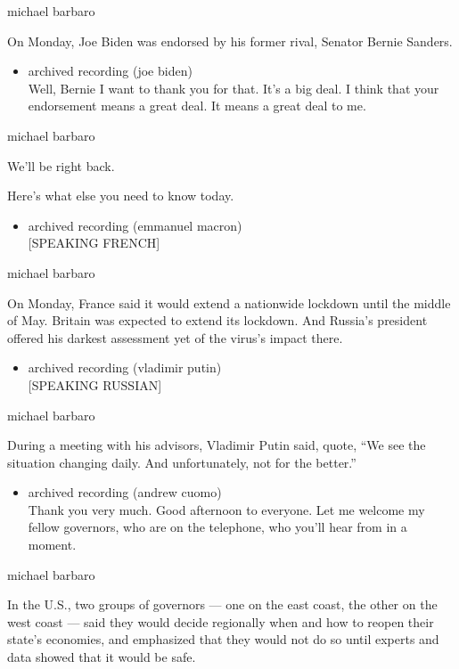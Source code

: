 michael barbaro

On Monday, Joe Biden was endorsed by his former rival, Senator Bernie
Sanders.

\begin{itemize}
\tightlist
\item
  archived recording (joe biden)\\
  Well, Bernie I want to thank you for that. It's a big deal. I think
  that your endorsement means a great deal. It means a great deal to me.
\end{itemize}

michael barbaro

We'll be right back.

Here's what else you need to know today.

\begin{itemize}
\tightlist
\item
  archived recording (emmanuel macron)\\
  {[}SPEAKING FRENCH{]}
\end{itemize}

michael barbaro

On Monday, France said it would extend a nationwide lockdown until the
middle of May. Britain was expected to extend its lockdown. And Russia's
president offered his darkest assessment yet of the virus's impact
there.

\begin{itemize}
\tightlist
\item
  archived recording (vladimir putin)\\
  {[}SPEAKING RUSSIAN{]}
\end{itemize}

michael barbaro

During a meeting with his advisors, Vladimir Putin said, quote, ``We see
the situation changing daily. And unfortunately, not for the better.''

\begin{itemize}
\tightlist
\item
  archived recording (andrew cuomo)\\
  Thank you very much. Good afternoon to everyone. Let me welcome my
  fellow governors, who are on the telephone, who you'll hear from in a
  moment.
\end{itemize}

michael barbaro

In the U.S., two groups of governors --- one on the east coast, the
other on the west coast --- said they would decide regionally when and
how to reopen their state's economies, and emphasized that they would
not do so until experts and data showed that it would be safe.

